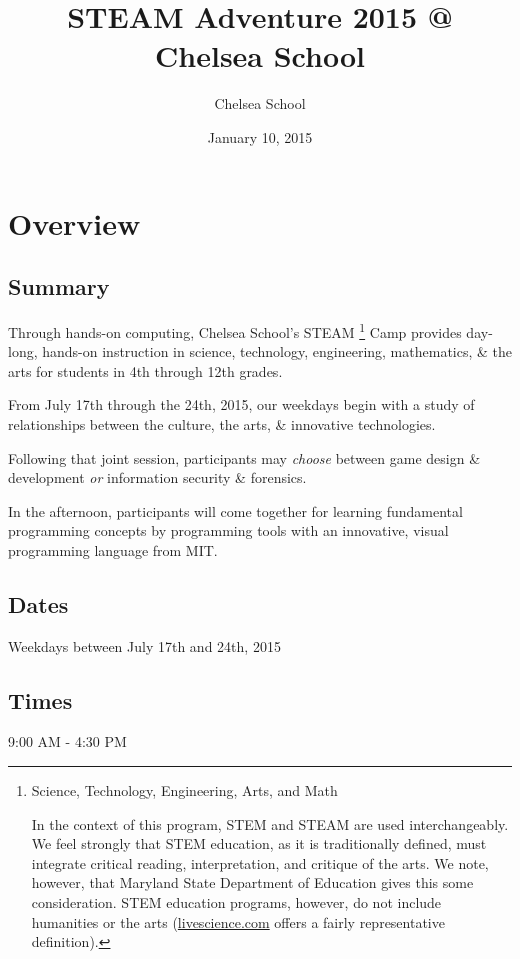 \documentclass[letterpaper,10pt,english]{sphinxmanual}
\title{STEAM Adventure 2015 @ Chelsea School}
\date{January 10, 2015}
\author{Chelsea School}
\begin{document}
\maketitle
\tableofcontents
{}\label{indepth::doc}



\chapter{Overview}
\label{description:steam-camp-2015}\label{description:overview}\label{description::doc}

\section{Summary}
\label{description:summary}
Through hands-on computing, Chelsea School's STEAM \footnote{
Science, Technology, Engineering, Arts, and Math

In the context of this program, STEM and STEAM are used interchangeably. We feel strongly that STEM education, as it is traditionally defined, must integrate critical reading, interpretation, and critique of the arts. We note, however, that Maryland State Department of Education gives this some consideration. STEM education programs, however, do not include humanities or the arts (\href{http://www.livescience.com/43296-what-is-stem-education.html}{livescience.com} offers a fairly representative definition).
} Camp provides day-long, hands-on instruction in science, technology, engineering, mathematics, \& the arts for students in 4th through 12th grades.

From July 17th through the 24th, 2015, our weekdays begin with a study of relationships between the culture, the arts, \& innovative technologies.

Following that joint session, participants may \emph{choose} between game design \& development \emph{or} information security \& forensics.

In the afternoon, participants will come together for learning fundamental programming concepts by programming tools with an innovative, visual programming language from MIT.


\section{Dates}
\label{description:dates}
Weekdays between July 17th and 24th, 2015


\section{Times}
\label{description:times}
9:00 AM - 4:30 PM
\end{document}
